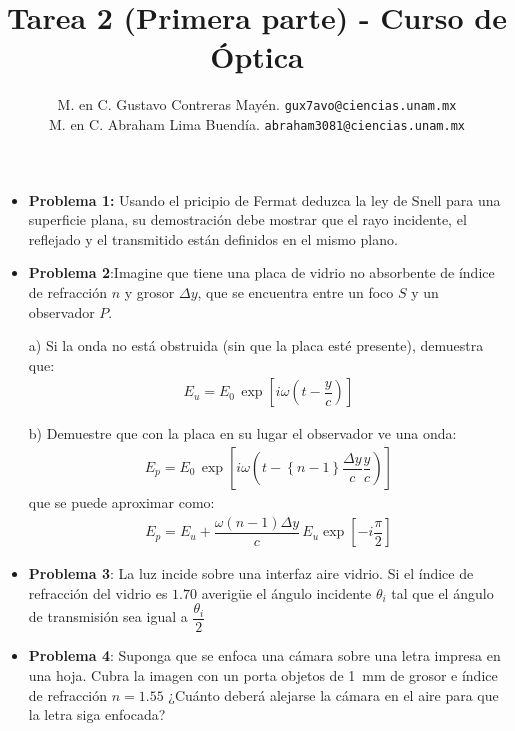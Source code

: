\documentclass[14pt]{extarticle}
\author{\normalsize{M. en C. Gustavo Contreras Mayén.} \quad \normalsize{\texttt{gux7avo@ciencias.unam.mx}} \\
\normalsize{M. en C. Abraham Lima Buendía.} \quad \normalsize{\texttt{abraham3081@ciencias.unam.mx}}}
\title{\vspace*{-2cm} Tarea 2 (Primera parte) - Curso de Óptica}
\date{ }
\begin{document}

\maketitle
\fontsize{14}{14}\selectfont

\begin{itemize}
\item \textbf{Problema 1: }Usando el pricipio de Fermat deduzca la ley de Snell para una superficie plana, su demostración debe mostrar que el rayo incidente, el reflejado y el transmitido están definidos en el mismo plano.
\item \textbf{Problema 2}:Imagine que tiene una placa de vidrio no absorbente de índice de refracción $n$ y grosor $\Delta y$, que se encuentra entre un foco $S$ y un observador $P$.

a) Si la onda no está obstruida (sin que la placa esté presente), demuestra que:
\begin{align*}
E_{u} = E_{0} \, \exp \left[i \omega \left(t - \dfrac{y}{c} \right) \right]
\end{align*}

b) Demuestre que con la placa en su lugar el observador ve una onda:
\begin{align*}
E_{p} = E_{0} \, \exp \left[ \displaystyle i \omega \left( t - \left\{ n-1\right\} \dfrac{\Delta y}{c}\dfrac{y}{c}\right) \right]
\end{align*}
que se puede aproximar como:
\begin{align*}
E_{p} = E_{u} + \dfrac{\omega (n - 1) \Delta y}{c} \, E_{u} \exp\left[-i \dfrac{\pi}{2} \right]
\end{align*}
\item \textbf{Problema 3}: La luz incide sobre una interfaz aire vidrio. Si el índice de refracción del vidrio es $1.70$ averigüe el ángulo incidente $\theta_{i}$ tal que el ángulo de transmisión sea igual a $\dfrac{\theta_{i}}{2}$
\item \textbf{Problema 4}: Suponga que se enfoca una cámara sobre una letra impresa en una hoja. Cubra la imagen con un porta objetos de \SI{1}{\milli\meter} de grosor e índice de refracción $n = 1.55$ ¿Cuánto deberá alejarse la cámara en el aire para que la letra siga enfocada?
\end{itemize}
\end{document}
